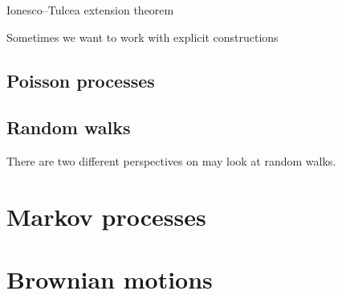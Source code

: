 \documentclass[10pt]{book}
\begin{document}
\begin{namedthm} \label{thm:Kolmogorov-ext}
    
\end{namedthm}

\begin{namedthm}
    
\end{namedthm}

Ionesco--Tulcea extension theorem

Sometimes we want to work with explicit constructions

\section{Poisson processes}
\begin{namedthm}
    
\end{namedthm}


\section{Random walks}
There are two different perspectives on may look at random walks.


\chapter{Markov processes}

\chapter{Brownian motions}




\appendix


\printbibliography[heading=bibintoc]

\printindex
\end{document}
